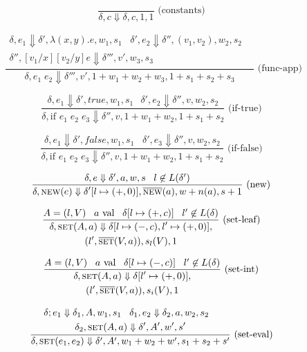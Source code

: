 \begin{figure}[!ht]
$$\frac{}{\delta, c \Downarrow \delta, c, 1, 1} \text{ (constants)}$$

$$\frac{\begin{gathered}\delta, e_1 \Downarrow \delta', \lambda (x,y) . e, w_1 , s_1 \;\;\; \delta', e_2 \Downarrow \delta'',(v_1, v_2), w_2 , s_2 \;\;\; \\ \delta'', [v_1/x][v_2/y]e \Downarrow \delta''', v', w_3 , s_3\end{gathered}}{\delta, e_1 \; e_2 \Downarrow \delta''', v', 1+w_1+w_2+w_3, 1+s_1+s_2+s_3} \text{ (func-app)}$$

$$\frac{\delta, e_1 \Downarrow \delta', true, w_1, s_1 \;\;\, \delta', e_2 \Downarrow \delta'', v, w_2, s_2}{\delta, \text{if } e_1 \; e_2 \; e_3 \Downarrow \delta'', v, 1+w_1+w_2, 1+s_1+s_2} \text{ (if-true)}$$

$$\frac{\delta, e_1 \Downarrow \delta', false, w_1, s_1 \;\;\; \delta', e_3 \Downarrow \delta'', v, w_2, s_2}{\delta, \text{if } e_1 \; e_2 \; e_3 \Downarrow \delta'', v, 1+w_1+w_2, 1+s_1+s_2} \text{ (if-false)}$$

$$\frac{\delta, e \Downarrow \delta', a, w, s \;\;\; l \not\in L(\delta')}{\begin{gathered}\delta, \text{{\sc new}}{}(e) \Downarrow \delta'[l \mapsto (+,0)], \overline{\mbox{{\sc new}{}}}(a), w + n(a), s+1\end{gathered}} \text{ (new)}$$

$$\frac{A = (l,V) \;\;\; a \text{ val} \;\;\; \delta[l \mapsto (+, c)] \;\;\; l' \not\in L(\delta)}{\begin{gathered}\delta, \text{{\sc set}}(A, a) \Downarrow \delta[l \mapsto (-, c), l' \mapsto (+, 0)], \\ (l', \overline{\mbox{{\sc set}{}}}(V, a)), s_l(V), 1\end{gathered}} \text{  (set-leaf)}$$

$$\frac{A = (l,V) \;\;\; a \text{ val} \;\;\; \delta[l \mapsto (-, c)] \;\;\;  l' \not\in L(\delta)}{\begin{gathered}\delta, \text{{\sc set}}(A, a) \Downarrow \delta[l' \mapsto (+, 0)], \\ (l', \overline{\mbox{{\sc set}{}}}(V, a)), s_i(V), 1\end{gathered}} \text{  (set-int)}$$

$$\frac{\begin{gathered}\delta; e_1 \Downarrow \delta_1, A, w_1, s_1 \;\;\; \delta_1, e_2 \Downarrow \delta_2, a, w_2, s_2 \;\;\; \\ \delta_2, \text{{\sc set}}(A, a) \Downarrow \delta', A', w', s' \end{gathered}}{\delta, \text{{\sc set}}(e_1, e_2) \Downarrow \delta', A', w_1+w_2+w', s_1+s_2+s'} \text{ (set-eval)}$$  


\end{figure}
